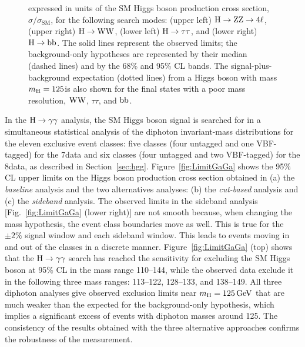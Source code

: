 \documentclass[11pt,twoside,a4paper,cmspaper,final,collab]{cms-tdr}
\begin{document}
\begin{figure}[htbp]
\begin{center}
{expressed in units of the SM Higgs boson production cross section,
$\sigma / \sigma_\text{SM}$,
for the following search modes:
     (upper left) $\mathrm{H} \to \mathrm{Z}\mathrm{Z} \to 4\ell$,
     (upper right) $\mathrm{H} \to \mathrm{W}\mathrm{W}$,
     (lower left) $\mathrm{H} \to \tau\tau$, and
     (lower right) $\mathrm{H} \to \mathrm{b}\mathrm{b}$.
     The solid lines represent the observed limits;
     the background-only hypotheses are represented by their median
 (dashed lines) and by the 68\% and 95\% CL bands.
     The signal-plus-background expectation (dotted lines) from a Higgs boson
     with mass $m_{\mathrm{H}} = 125$\GeV is also shown for the final states
     with a poor mass resolution, $\mathrm{W}\mathrm{W}$, $\tau\tau$, and $\mathrm{b}\mathrm{b}$.
     }
      \label{fig:Limit}
    \end{center}
\end{figure}



In the $\mathrm{H} \to \gamma\gamma$ analysis,
the SM Higgs boson signal is searched for in a simultaneous statistical analysis of the diphoton
invariant-mass distributions for the eleven exclusive event classes:
five classes (four untagged and one VBF-tagged) for the 7\TeV data and
six classes (four untagged and two VBF-tagged) for the 8\TeV data, as described in Section~\ref{sec:hgg}.
Figure~\ref{fig:LimitGaGa} shows the 95\% CL upper limits on
the Higgs boson production cross section obtained in
(a) the \emph{baseline} analysis and the two alternatives analyses:
(b) the \emph{cut-based} analysis and
(c) the \emph{sideband} analysis.
The observed limits in the sideband analysis [Fig.~\ref{fig:LimitGaGa} (lower right)]
are not smooth because, when changing the mass hypothesis, the event class boundaries move as well.
This is true for the ${\pm}2\%$ signal window and each sideband window.
This leads to events moving in and out of the classes in a discrete manner.
Figure~\ref{fig:LimitGaGa} (top) shows that the $\mathrm{H} \to \gamma\gamma$ search has reached
the sensitivity for excluding the SM Higgs boson at 95\% CL
in the mass range 110--144\GeV,
while the observed data exclude it in the following three mass ranges:
113--122\GeV, 128--133\GeV, and 138--149\GeV.
All three diphoton analyses give observed exclusion limits near $m_{\mathrm{H}}=125\,\text{Ge\hspace{-.08em}V}$
that are much weaker than the expected for the background-only hypothesis,
which implies a significant excess of events with diphoton masses around 125\GeV.
The consistency of the results obtained with the three alternative approaches
confirms
the robustness of the measurement.
\end{document}
